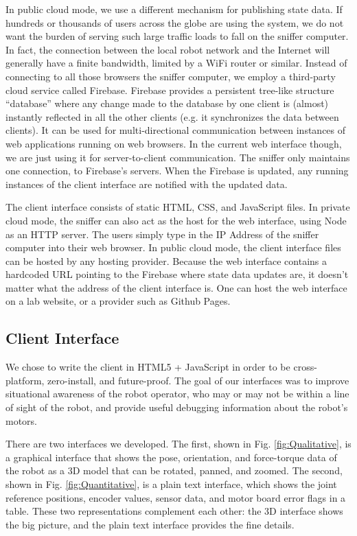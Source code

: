 \documentclass[letterpaper, 10 pt, conference]{ieee/ieeeconf}  %
\begin{document}
In public cloud mode, we use a different mechanism for publishing state data.
If hundreds or thousands of users across the globe are using the system, we do not want the burden of serving such large traffic loads to fall on the sniffer computer.
In fact, the connection between the local robot network and the Internet will generally have a finite bandwidth, limited by a WiFi router or similar.
Instead of connecting to all those browsers the sniffer computer, we employ a third-party cloud service called Firebase.
Firebase provides a persistent tree-like structure ``database'' where any change made to the database by one client is (almost) instantly reflected in all the other clients (e.g. it synchronizes the data between clients).
It can be used for multi-directional communication between instances of web applications running on web browsers.
In the current web interface though, we are just using it for server-to-client communication.
The sniffer only maintains one connection, to Firebase's servers.
When the Firebase is updated, any running instances of the client interface are notified with the updated data.

The client interface consists of static HTML, CSS, and JavaScript files.
In private cloud mode, the sniffer can also act as the host for the web interface, using Node as an HTTP server.
The users simply type in the IP Address of the sniffer computer into their web browser.
In public cloud mode, the client interface files can be hosted by any hosting provider.
Because the web interface contains a hardcoded URL pointing to the Firebase where state data updates are, it doesn't matter what the address of the client interface is.
One can host the web interface on a lab website, or a provider such as Github Pages.

\subsection{Client Interface}
We chose to write the client in HTML5 + JavaScript in order to be cross-platform, zero-install, and future-proof.
The goal of our interfaces was to improve situational awareness of the robot operator, who may or may not be within a line of sight of the robot, and provide useful debugging information about the robot's motors.

There are two interfaces we developed.
The first, shown in Fig. \ref{fig:Qualitative}, is a graphical interface that shows the pose, orientation, and force-torque data of the robot as a 3D model that can be rotated, panned, and zoomed.
The second, shown in Fig. \ref{fig:Quantitative}, is a plain text interface, which shows the joint reference positions, encoder values, sensor data, and motor board error flags in a table.
These two representations complement each other: the 3D interface shows the big picture, and the plain text interface provides the fine details.
\end{document}
